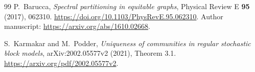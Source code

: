 \documentclass[11pt]{article}
\theoremstyle{definition}
\theoremstyle{remark}
\newcommand{\1}{\mathbf 1}
\begin{document}
\begin{thebibliography}{99}
P.~Barucca, \emph{Spectral partitioning in equitable graphs},
Physical Review E \textbf{95} (2017), 062310.
\url{https://doi.org/10.1103/PhysRevE.95.062310}.
Author manuscript: \url{https://arxiv.org/abs/1610.02668}.

S.~Karmakar and M.~Podder, \emph{Uniqueness of communities in regular
stochastic block models}, arXiv:2002.05577v2 (2021), Theorem 3.1.
\url{https://arxiv.org/pdf/2002.05577v2}.

\end{thebibliography}
\end{document}
